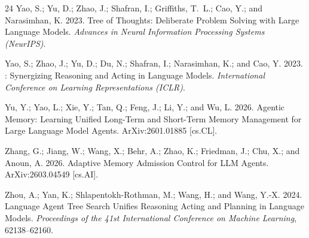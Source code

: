 \documentclass[letterpaper]{article}
\begin{document}
\begin{thebibliography}{24}
Yao, S.; Yu, D.; Zhao, J.; Shafran, I.; Griffiths, T.~L.; Cao, Y.; and
  Narasimhan, K. 2023{}.
\newblock Tree of {Thoughts}: {Deliberate} {Problem} {Solving} with {Large}
  {Language} {Models}.
\newblock \emph{Advances in Neural Information Processing Systems (NeurIPS)}.

Yao, S.; Zhao, J.; Yu, D.; Du, N.; Shafran, I.; Narasimhan, K.; and Cao, Y.
  2023{}.
: {Synergizing} {Reasoning} and {Acting} in {Language}
  {Models}.
\newblock \emph{International Conference on Learning Representations (ICLR)}.

Yu, Y.; Yao, L.; Xie, Y.; Tan, Q.; Feng, J.; Li, Y.; and Wu, L. 2026.
\newblock Agentic {Memory}: {Learning} {Unified} {Long}-{Term} and
  {Short}-{Term} {Memory} {Management} for {Large} {Language} {Model} {Agents}.
\newblock ArXiv:2601.01885 [cs.CL].

Zhang, G.; Jiang, W.; Wang, X.; Behr, A.; Zhao, K.; Friedman, J.; Chu, X.; and
  Anoun, A. 2026.
\newblock Adaptive {Memory} {Admission} {Control} for {LLM} {Agents}.
\newblock ArXiv:2603.04549 [cs.AI].

Zhou, A.; Yan, K.; Shlapentokh-Rothman, M.; Wang, H.; and Wang, Y.-X. 2024.
\newblock Language {Agent} {Tree} {Search} {Unifies} {Reasoning} {Acting} and
  {Planning} in {Language} {Models}.
\newblock \emph{Proceedings of the 41st International Conference on Machine
  Learning}, 62138--62160.

\end{thebibliography}
\end{document}
